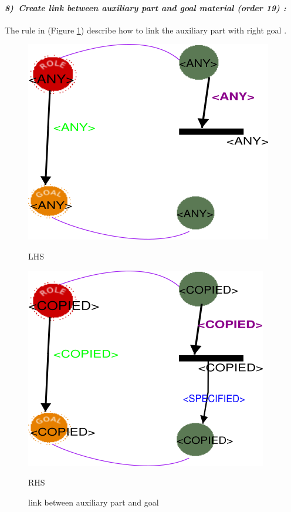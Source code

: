 \paragraph{\emph{8)~Create link between auxiliary part and  goal material  (order 19) :} }
 
 
The rule in (Figure \ref{fig:link between auxiliary part and goal})  describe 
how to link the auxiliary part with right goal .  
\vspace{1cm}
\begin{figure}[th]
\centering
\begin{minipage}{.6\textwidth}
 
  \includegraphics[width=.7\linewidth]{Chapiter3/img/L8}
  \linebreak

\hspace{2.5cm}  LHS
 
  
\end{minipage}%
\begin{minipage}{.6\textwidth}
 
  \includegraphics[width=.7\linewidth]{Chapiter3/img/R8}
\linebreak  

\hspace{2.5cm}  RHS 
 
\end{minipage}
\caption{\label{fig:link between auxiliary part and goal}link between auxiliary part and goal}
 
\end{figure}


